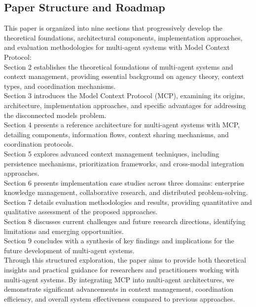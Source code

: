 \subsection{Paper Structure and Roadmap}
This paper is organized into nine sections that progressively develop the theoretical foundations, architectural components, implementation approaches, and evaluation methodologies for multi-agent systems with Model Context Protocol:\\ \newline
Section 2 establishes the theoretical foundations of multi-agent systems and context management, providing essential background on agency theory, context types, and coordination mechanisms.\\ \newline
Section 3 introduces the Model Context Protocol (MCP), examining its origins, architecture, implementation approaches, and specific advantages for addressing the disconnected models problem.\\ \newline
Section 4 presents a reference architecture for multi-agent systems with MCP, detailing components, information flows, context sharing mechanisms, and coordination protocols.\\ \newline
Section 5 explores advanced context management techniques, including persistence mechanisms, prioritization frameworks, and cross-modal integration approaches.\\ \newline
Section 6 presents implementation case studies across three domains: enterprise knowledge management, collaborative research, and distributed problem-solving.\\ \newline
Section 7 details evaluation methodologies and results, providing quantitative and qualitative assessment of the proposed approaches.\\ \newline
Section 8 discusses current challenges and future research directions, identifying limitations and emerging opportunities.\\ \newline
Section 9 concludes with a synthesis of key findings and implications for the future development of multi-agent systems.\\ \newline
Through this structured exploration, the paper aims to provide both theoretical insights and practical guidance for researchers and practitioners working with multi-agent systems. By integrating MCP into multi-agent architectures, we demonstrate significant advancements in context management, coordination efficiency, and overall system effectiveness compared to previous approaches.\\ \newline